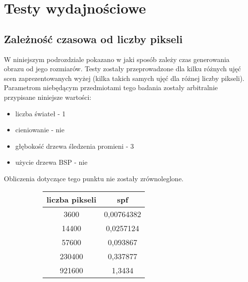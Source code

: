 \section{Testy wydajnościowe}

\subsection{Zależność czasowa od liczby pikseli}

W niniejszym podrozdziale pokazano w jaki sposób zależy czas generowania obrazu od jego rozmiarów. Testy zostały przeprowadzone dla kilku różnych ujęć scen zaprezentowanych wyżej (kilka takich samych ujęć dla różnej liczby pikseli). Parametrom niebędącym przedmiotami tego badania zostały arbitralnie przypisane niniejsze wartości:

\begin{itemize}

\item liczba świateł - 1
\item cieniowanie - nie
\item głębokość drzewa śledzenia promieni - 3
\item użycie drzewa BSP - nie

\end{itemize}

Obliczenia dotyczące tego punktu nie zostały zrównoleglone.

\begin{figure}[!ht]
\advance\leftskip-2cm
\begin{subfigure}{.5\textwidth}
\end{subfigure}
\hspace{2cm}
\begin{subfigure}{.5\textwidth}
		\begin{longtable}{|c|c|} \hline
	    liczba pikseli & spf \\ \hline
	    3600 & 0,00764382 \\ 
	    14400 & 0,0257124 \\
		57600 & 0,093867 \\
		230400 & 0,337877 \\
		921600 & 1,3434 \\
		\hline
		\end{longtable}
\end{subfigure}
\end{figure}

